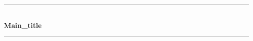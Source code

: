 \documentclass[12pt,a4paper]{article}
\begin{document}
\begin{titlepage}


\newcommand{\HRule}{\rule{\linewidth}{0.5mm}} %

\center %








\makeatletter

\HRule \\[0.4cm] %

\huge{\bfseries \@g  Main\_title}

\HRule \\[1.5cm] %



\vfill %
\vspace*{\fill}

\end{titlepage}

























\end{document}
